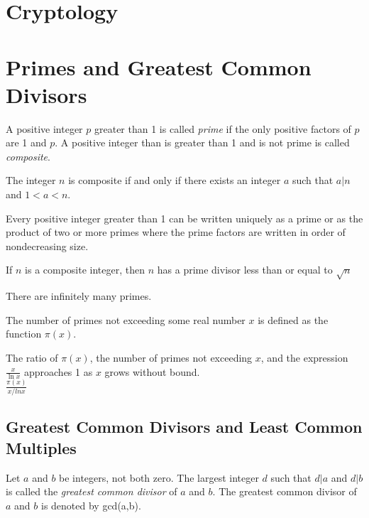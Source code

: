 \section{Cryptology}

\section {Primes and Greatest Common Divisors}
\begin{definition}
A positive integer $p$ greater than 1 is called \textit{prime} if the only positive factors of $p$ are 1 and $p$. A positive integer than is greater than 1 and is not prime is called \textit{composite}.
\end{definition}

\begin{notes}
The integer $n$ is composite if and only if there exists an integer $a$ such that $a \vert n$ and $1<a<n$.
\end{notes}

\begin{theorem} 
Every positive integer greater than 1 can be written uniquely as a prime or as the product of two or more primes where the prime factors are written in order of nondecreasing size.
\end{theorem}

\begin{theorem}
If $n$ is a composite integer, then $n$ has a prime divisor less than or equal to $\sqrt{n}$
\end{theorem}

\begin{theorem}
There are infinitely many primes.
\end{theorem}

\begin{definition}
The number of primes not exceeding some real number $x$ is defined as the function $\pi(x)$.
\end{definition}

\begin{theorem}
The ratio of $\pi(x)$, the number of primes not exceeding $x$, and the expression $\frac{x}{\ln{x}}$ approaches 1 as $x$ grows without bound.\\
$\frac{\pi(x)}{x / ln x}$
\end{theorem}

  \subsection {Greatest Common Divisors and Least Common Multiples}
\begin{definition}
Let $a$ and $b$ be integers, not both zero. The largest integer $d$ such that $d \vert a$ and $d \vert b$ is called the \textit{greatest common divisor} of $a$ and $b$. The greatest common divisor of $a$ and $b$ is denoted by gcd(a,b).
\end{definition}

